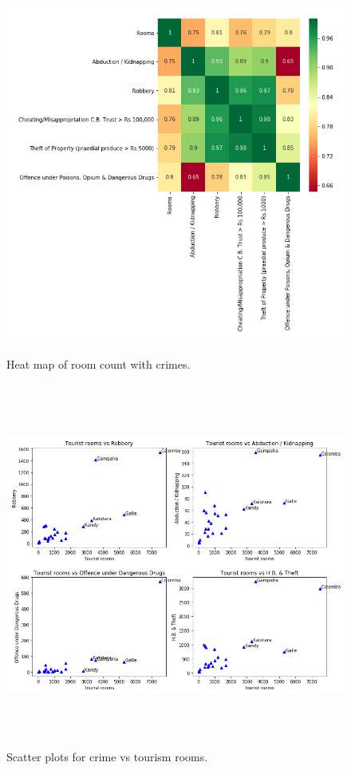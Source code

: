 \documentclass[conference]{IEEEtran}
\begin{document}
\begin{figure}[htbp]
\centerline{\includegraphics[width=\textwidth,height=12cm]{fig1.PNG}}
\caption{Heat map of room count with crimes.}
\label{fig1}
\end{figure}

\begin{figure}[htbp]
\centerline{\includegraphics[width=\textwidth,height=12cm]{scatter1.PNG}}
\caption{Scatter plots for crime vs tourism rooms.}
\label{scatter}
\end{figure}
\end{document}
